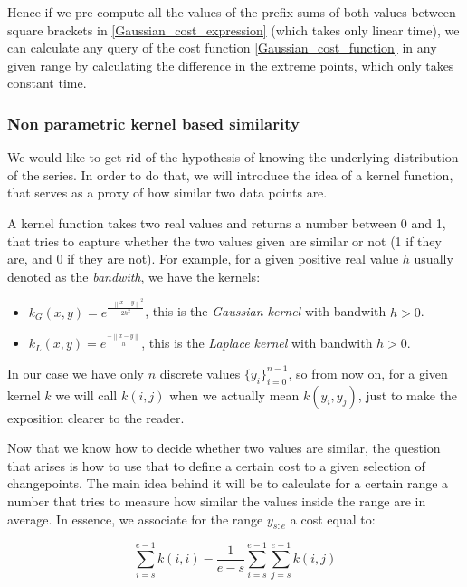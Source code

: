 \documentclass[pdflatex,sn-mathphys]{sn-jnl}%
\theoremstyle{thmstyleone}%
\theoremstyle{thmstyletwo}%
\theoremstyle{thmstylethree}%
\begin{document}
Hence if we pre-compute all the values of the prefix sums of both values between square brackets in \ref{Gaussian_cost_expression} (which takes only linear time), we can calculate any query of the cost function \ref{Gaussian_cost_function} in any given range by calculating the difference in the extreme points, which only takes constant time.

\subsubsection{Non parametric kernel based similarity}

We would like to get rid of the hypothesis of knowing the underlying distribution of the series. In order to do that, we will introduce the idea of a kernel function, that serves as a proxy of how similar two data points are. 

A kernel function takes two real values and returns a number between 0 and 1, that tries to capture whether the two values given are similar or not (1 if they are, and 0 if they are not). For example, for a given positive real value $h$ usually denoted as the \textit{bandwith}, we have the kernels:

\begin{itemize}
    \item $k_G(x,y) = e^{\frac{-\left \| x-y \right \|^2}{2h^2}}$, this is the \textit{Gaussian kernel} with bandwith $h>0$.
    \item $k_L(x,y) = e^{\frac{-\left \| x-y \right \|}{h}}$, this is the \textit{Laplace kernel} with bandwith $h>0$.
\end{itemize}

In our case we have only $n$ discrete values $\{y_i\}_{i=0}^{n-1}$, so from now on, for a given kernel $k$ we will call $k(i,j)$ when we actually mean $k(y_i, y_j)$, just to make the exposition clearer to the reader.

Now that we know how to decide whether two values are similar, the question that arises is how to use that to define a certain cost to a given selection of changepoints. The main idea behind it will be to calculate for a certain range a number that tries to measure how similar the values inside the range are in average. In essence, we associate for the range $y_{s:e}$ a cost equal to:

\begin{equation}
    \sum\limits_{i=s}^{e-1}k(i,i) - \frac{1}{e-s} \sum\limits_{i=s}^{e-1}\sum\limits_{j=s}^{e-1}k(i,j)
    \label{kernel_cost_range}
\end{equation}
\end{document}
